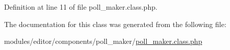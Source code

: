 Definition at line 11 of file poll\-\_\-maker.\-class.\-php.



The documentation for this class was generated from the following file\-:\begin{DoxyCompactItemize}
\item 
modules/editor/components/poll\-\_\-maker/\hyperlink{poll__maker_8class_8php}{poll\-\_\-maker.\-class.\-php}\end{DoxyCompactItemize}
